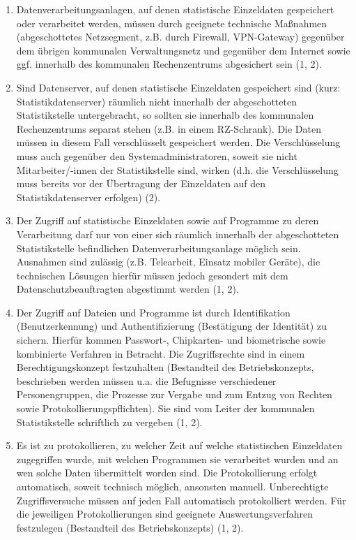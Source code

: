         \begin{enumerate}[label=arabic*.]
            \item Datenverarbeitungsanlagen, auf denen statistische Einzeldaten gespeichert oder verarbeitet werden, müssen durch geeignete technische Maßnahmen (abgeschottetes Netzsegment, z.B. durch Firewall, VPN-Gateway) gegenüber dem übrigen kommunalen Verwaltungsnetz und gegenüber dem Internet sowie ggf. innerhalb des kommunalen Rechenzentrums abgesichert sein (1, 2).
            \item Sind Datenserver, auf denen statistische Einzeldaten gespeichert sind (kurz: Statistikdatenserver) räumlich nicht innerhalb der abgeschotteten Statistikstelle untergebracht, so sollten sie innerhalb des kommunalen Rechenzentrums separat stehen (z.B. in einem RZ-Schrank). Die Daten müssen in diesem Fall verschlüsselt gespeichert werden. Die Verschlüsselung muss auch gegenüber den Systemadministratoren, soweit sie nicht Mitarbeiter/-innen der Statistikstelle sind, wirken (d.h. die Verschlüsselung muss bereits vor der Übertragung der Einzeldaten auf den Statistikdatenserver erfolgen) (2).
            \item Der Zugriff auf statistische Einzeldaten sowie auf Programme zu deren Verarbeitung darf nur von einer sich räumlich innerhalb der abgeschotteten Statistikstelle befindlichen Datenverarbeitungsanlage möglich sein. Ausnahmen sind zulässig (z.B. Telearbeit, Einsatz mobiler Geräte), die technischen Lösungen hierfür müssen jedoch gesondert mit dem Datenschutzbeauftragten abgestimmt werden (1, 2).
            \item Der Zugriff auf Dateien und Programme ist durch Identifikation (Benutzerkennung) und Authentifizierung (Bestätigung der Identität) zu sichern. Hierfür kommen Passwort-, Chipkarten- und biometrische sowie kombinierte Verfahren in Betracht. Die Zugriffsrechte sind in einem Berechtigungskonzept festzuhalten (Bestandteil des Betriebskonzepts, beschrieben werden müssen u.a. die Befugnisse verschiedener Personengruppen, die Prozesse zur Vergabe und zum Entzug von Rechten sowie Protokollierungspflichten). Sie sind vom Leiter der kommunalen Statistikstelle schriftlich zu vergeben (1, 2).
            \item Es ist zu protokollieren, zu welcher Zeit auf welche statistischen Einzeldaten zugegriffen wurde, mit welchen Programmen sie verarbeitet wurden und an wen solche Daten übermittelt worden sind. Die Protokollierung erfolgt automatisch, soweit technisch möglich, ansonsten manuell. Unberechtigte Zugriffsversuche müssen auf jeden Fall automatisch protokolliert werden. Für die jeweiligen Protokollierungen sind geeignete Auswertungsverfahren festzulegen (Bestandteil des Betriebskonzepts) (1, 2).

\end{enumerate}
